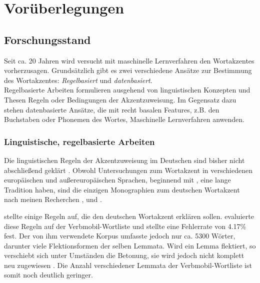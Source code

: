 \chapter{Vorüberlegungen}
\section{Forschungsstand}

Seit ca. 20 Jahren wird versucht mit maschinelle Lernverfahren den Wortakzentes vorherzusagen. Grundsätzlich gibt es zwei verschiedene Ansätze zur Bestimmung des Wortakzentes: \textit{Regelbasiert} und \textit{datenbasiert}.
\\
Regelbasierte Arbeiten formulieren ausgehend von linguistischen Konzepten und Thesen Regeln oder Bedingungen der Akzentzuweisung. Im Gegensatz dazu stehen datenbasierte Ansätze, die mit recht basalen Features, z.B. den Buchstaben oder Phonemen des Wortes, Maschinelle Lernverfahren anwenden.

\subsection{Linguistische, regelbasierte Arbeiten}

Die linguistischen Regeln der Akzentzuweisung im Deutschen sind bisher nicht abschließend geklärt \cite[S.~11]{Janssen2003}. Obwohl Untersuchungen zum Wortakzent in verschiedenen europäischen und außereuropäischen Sprachen, beginnend mit \cite{Chomsky&Halle1968}, eine lange Tradition haben, sind die einzigen Monographien zum deutschen Wortakzent nach meinen Recherchen \cite{Giegerich1985}, \cite{Mengel1998} und \cite{Janssen2003}.

\cite{Jessen1999} stellte einige Regeln auf, die den deutschen Wortakzent erklären sollen. \cite{Wagner2001} evaluierte diese Regeln auf der Verbmobil-Wortliste \cite{Lungen&Ehlebracht1998} und stellte eine Fehlerrate von 4.17\% fest. Der von ihm verwendete Korpus umfasste jedoch nur ca. 5300 Wörter, darunter viele Flektionsformen der selben Lemmata.
Wird ein Lemma flektiert, so verschiebt sich unter Umständen die Betonung, sie wird jedoch nicht komplett neu zugewiesen \cite{???}. Die Anzahl verschiedener Lemmata der Verbmobil-Wortliste ist somit noch deutlich geringer.

